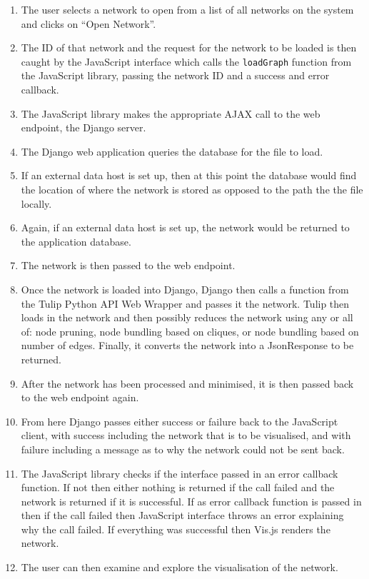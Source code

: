 \documentclass[../dissertation.tex]{subfiles}
\begin{document}
\begin{enumerate}
    \item The user selects a network to open from a list of all networks on the system and clicks on ``Open Network''.
    \item The ID of that network and the request for the network to be loaded is then caught by the JavaScript interface which calls the \texttt{loadGraph} function from the JavaScript library, passing the network ID and a success and error callback.
    \item The JavaScript library makes the appropriate AJAX call to the web endpoint, the Django server.
    \item The Django web application queries the database for the file to load.
    \item If an external data host is set up, then at this point the database would find the location of where the network is stored as opposed to the path the the file locally.
    \item Again, if an external data host is set up, the network would be returned to the application database.
    \item The network is then passed to the web endpoint.
    \item Once the network is loaded into Django, Django then calls a function from the Tulip Python API Web Wrapper and passes it the network. Tulip then loads in the network and then possibly reduces the network using any or all of: node pruning, node bundling based on cliques, or node bundling based on number of edges. Finally, it converts the network into a JsonResponse to be returned.
    \item After the network has been processed and minimised, it is then passed back to the web endpoint again.
    \item From here Django passes either success or failure back to the JavaScript client, with success including the network that is to be visualised, and with failure including a message as to why the network could not be sent back.
    \item The JavaScript library checks if the interface passed in an error callback function. If not then either nothing is returned if the call failed and the network is returned if it is successful. If as error callback function is passed in then if the call failed then JavaScript interface throws an error explaining why the call failed. If everything was successful then Vis.js renders the network.
    \item The user can then examine and explore the visualisation of the network.
\end{enumerate}
\end{document}
